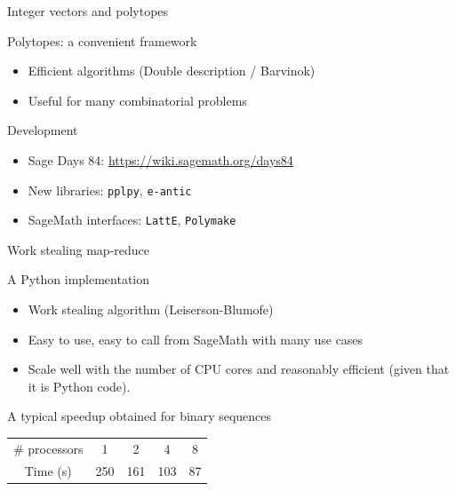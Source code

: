 \documentclass{beamer}
\begin{document}
\begin{frame}{Integer vectors and polytopes}

  \begin{block}{Polytopes: a convenient framework}
   \begin{itemize}
   \item Efficient algorithms (Double description / Barvinok)
   \item Useful for many combinatorial problems
   \end{itemize}
  \end{block}

  \begin{block}{Development}
  \begin{itemize}
  \item Sage Days 84: \url{https://wiki.sagemath.org/days84}
  \item New libraries: \texttt{pplpy}, \texttt{e-antic}
  \item SageMath interfaces: \texttt{LattE}, \texttt{Polymake}
  \end{itemize}
  \end{block}

\end{frame}

\begin{frame}{Work stealing map-reduce}

  \begin{block}{A Python implementation}
    \begin{itemize}
    \item Work stealing algorithm (Leiserson-Blumofe)
    \item Easy to use, easy to call from SageMath with many use cases
    \item Scale well with the number of CPU cores and reasonably efficient (given that it is Python code).
    \end{itemize}
  \end{block}

  A typical speedup obtained for binary sequences 
  \begin{center}\begin{tabular}{c|cccc}
    \# processors & 1 & 2 & 4 & 8\\
    Time (s) & 250 & 161 & 103 & 87
  \end{tabular}\end{center}
 
\end{frame}
\end{document}
